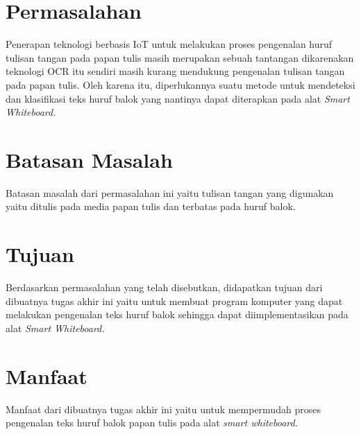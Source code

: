 \section{Permasalahan}
\label{sec:permasalahan}
Penerapan teknologi berbasis IoT untuk melakukan proses pengenalan huruf tulisan tangan pada papan tulis masih merupakan sebuah tantangan dikarenakan teknologi OCR itu sendiri masih kurang mendukung pengenalan tulisan tangan pada papan tulis. Oleh karena itu, diperlukannya suatu metode untuk mendeteksi dan klasifikasi teks huruf balok yang nantinya dapat diterapkan pada alat \textit{Smart Whiteboard.}


\section{Batasan Masalah}
\label{sec:batasanmasalah}

Batasan masalah dari permasalahan ini yaitu tulisan tangan yang digunakan yaitu ditulis pada media papan tulis dan terbatas pada huruf balok.

\section{Tujuan}
\label{sec:Tujuan}

Berdasarkan permasalahan yang telah disebutkan, didapatkan tujuan dari dibuatnya tugas akhir ini yaitu untuk membuat program komputer yang dapat melakukan pengenalan teks huruf balok sehingga dapat diimplementasikan pada alat \textit{Smart Whiteboard.}

\section{Manfaat}
\label{sec:manfaat}

Manfaat dari dibuatnya tugas akhir ini yaitu untuk mempermudah proses pengenalan teks huruf balok papan tulis pada alat \textit{smart whiteboard.}





